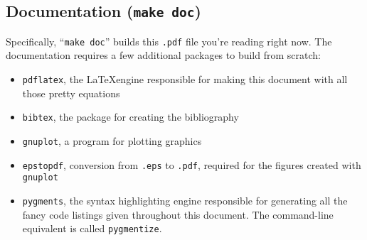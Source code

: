 \subsection{Documentation ({\tt make doc})}
\label{section:installation:targets:doc}
Specifically, ``{\tt make doc}'' builds this {\tt .pdf} file you're
reading right now.
The documentation requires a few additional packages to build from
scratch:
%
\begin{itemize}
\item {\tt pdflatex}, the \LaTeX engine responsible for making this
      document with all those pretty equations
\item {\tt bibtex}, the package for creating the bibliography
\item {\tt gnuplot}, a program for plotting graphics
\item {\tt epstopdf}, conversion from {\tt .eps} to {\tt .pdf}, required
      for the figures created with {\tt gnuplot}
\item {\tt pygments}, the syntax highlighting engine responsible for
      generating all the fancy code listings given throughout this
      document.
      The command-line equivalent is called {\tt pygmentize}.
\end{itemize}
%

